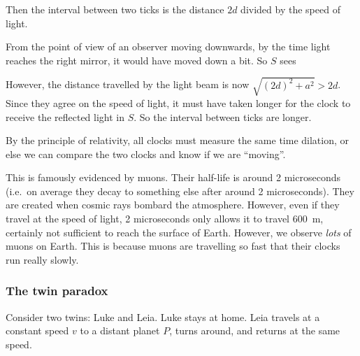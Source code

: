 \documentclass[a4paper]{article}
\begin{document}
Then the interval between two ticks is the distance $2d$ divided by the speed of light.
\begin{center}
\end{center}
From the point of view of an observer moving downwards, by the time light reaches the right mirror, it would have moved down a bit. So $S$ sees
\begin{center}
\end{center}
However, the distance travelled by the light beam is now $\sqrt{(2d)^2 + a^2} > 2d$. Since they agree on the speed of light, it must have taken longer for the clock to receive the reflected light in $S$. So the interval between ticks are longer.

By the principle of relativity, all clocks must measure the same time dilation, or else we can compare the two clocks and know if we are ``moving''.

This is famously evidenced by muons. Their half-life is around 2 microseconds (i.e.\ on average they decay to something else after around 2 microseconds). They are created when cosmic rays bombard the atmosphere. However, even if they travel at the speed of light, 2 microseconds only allows it to travel \SI{600}{m}, certainly not sufficient to reach the surface of Earth. However, we observe \emph{lots} of muons on Earth. This is because muons are travelling so fast that their clocks run really slowly.

\subsubsection*{The twin paradox}
Consider two twins: Luke and Leia. Luke stays at home. Leia travels at a constant speed $v$ to a distant planet $P$, turns around, and returns at the same speed.
\end{document}
